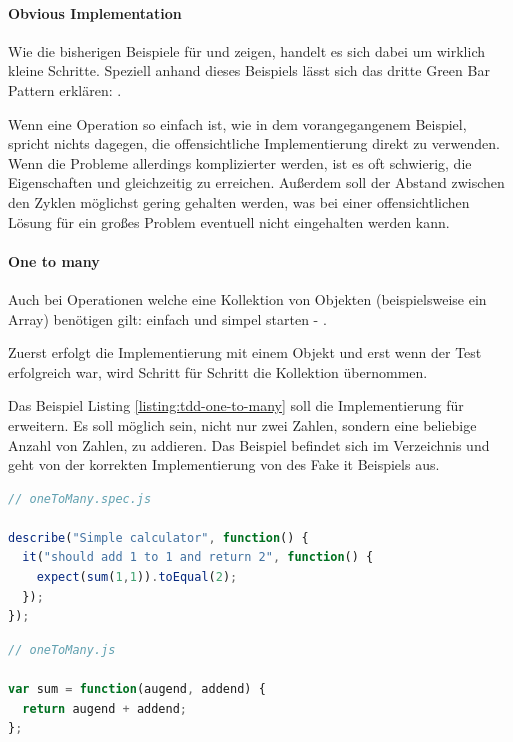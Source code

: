 \paragraph{Obvious Implementation}

Wie die bisherigen Beispiele für  und  zeigen, handelt es sich dabei um wirklich kleine Schritte. Speziell anhand dieses Beispiels lässt sich das dritte Green Bar Pattern erklären: .

Wenn eine Operation so einfach ist, wie in dem vorangegangenem Beispiel, spricht nichts dagegen, die offensichtliche Implementierung direkt zu verwenden.
Wenn die Probleme allerdings komplizierter werden, ist es oft schwierig, die Eigenschaften  und  gleichzeitig zu erreichen. Außerdem soll der Abstand zwischen den Zyklen möglichst gering gehalten werden, was bei einer offensichtlichen Lösung für ein großes Problem eventuell nicht eingehalten werden kann.

\paragraph{One to many}

Auch bei Operationen welche eine Kollektion von Objekten (beispielsweise ein Array) benötigen gilt: einfach und simpel starten -  \autocite[154]{Beck:2003}.

Zuerst erfolgt die Implementierung mit einem Objekt und erst wenn der Test erfolgreich war, wird Schritt für Schritt die Kollektion übernommen.

Das Beispiel Listing \ref{listing:tdd-one-to-many} soll die Implementierung für  erweitern. Es soll möglich sein, nicht nur zwei Zahlen, sondern eine beliebige Anzahl von Zahlen, zu addieren. Das Beispiel befindet sich im Verzeichnis  und geht von der korrekten Implementierung von  des Fake it Beispiels aus.

\begin{lstlisting}[language=JavaScript, caption=TDD - One to many, label=listing:tdd-one-to-many]
// oneToMany.spec.js

describe("Simple calculator", function() {
  it("should add 1 to 1 and return 2", function() {
    expect(sum(1,1)).toEqual(2);
  });
});
\end{lstlisting}
\newpage
\begin{lstlisting}[language=JavaScript, caption=TDD - One to many - Implementation]
// oneToMany.js

var sum = function(augend, addend) {
  return augend + addend;
};
\end{lstlisting}

